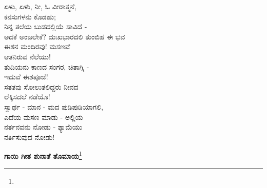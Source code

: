 ಏಳು, ಏಳು, ನೀ, ಓ ವೀರಾತ್ಮನೆ,\\ಕನಸುಗಳನು ಕೊಡಹು;\\ನಿನ್ನ ತಲೆಯ ಬುಡದಲ್ಲಿಯೆ ಸಾವಿದೆ -\\ಅದಕೆ ಅಂಜಲೇಕೆ? ದುಃಖಭಾರದಲಿ ತುಂಬಿಹ ಈ ಭವ\\ಈಶನ ಮಂದಿರವು! ಮಸಣವೆ\\ಆತನಿರುವ ನೆಲೆಯು!\\ತುದಿಯನು ಕಾಣದ ಸಂಗರ, ಚಿತಾಗ್ನಿ -\\ಇದುವೆ ಈಶಪೂಜೆ!\\ಸತತವು ಸೋಲುತಲಿದ್ದರು ನೀನದ\\ಲೆಕ್ಕಿಸದಲೆ ನಡೆಯೊ!\\ಸ್ವಾರ್ಥ - ಮಾನ - ಮದ ಪುಡಿಪುಡಿಯಾಗಲಿ,\\ಎದೆಯ ಮಸಣ ಮಾಡು - ಅಲ್ಲಿಯ\\ನರ್ತನವನು ನೋಡು - ಶ್ಯಾಮೆಯು\\ನರ್ತಿಸುವುದ ನೋಡು!

\begin{center}
\textbf{ಗಾಯಿ ಗೀತ ಶುನಾತೆ ತೊಮಾಯ}\footnote{}
\end{center}

